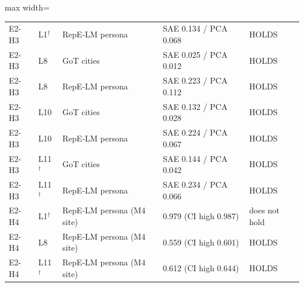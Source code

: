 \begin{table}[t]
\begin{adjustbox}{max width=\linewidth}
\begin{tabular}{lllll}
\midrule
E2-H3 & L1$^\dagger$ & RepE-LM persona & SAE 0.134 / PCA 0.068 & HOLDS \\
E2-H3 & L8 & GoT cities & SAE 0.025 / PCA 0.012 & HOLDS \\
E2-H3 & L8 & RepE-LM persona & SAE 0.223 / PCA 0.112 & HOLDS \\
E2-H3 & L10 & GoT cities & SAE 0.132 / PCA 0.028 & HOLDS \\
E2-H3 & L10 & RepE-LM persona & SAE 0.224 / PCA 0.067 & HOLDS \\
E2-H3 & L11$^\dagger$ & GoT cities & SAE 0.144 / PCA 0.042 & HOLDS \\
E2-H3 & L11$^\dagger$ & RepE-LM persona & SAE 0.234 / PCA 0.066 & HOLDS \\
\midrule
E2-H4 & L1$^\dagger$ & RepE-LM persona (M4 site) & 0.979 (CI high 0.987) & does not hold \\
E2-H4 & L8 & RepE-LM persona (M4 site) & 0.559 (CI high 0.601) & HOLDS \\
E2-H4 & L11$^\dagger$ & RepE-LM persona (M4 site) & 0.612 (CI high 0.644) & HOLDS \\
\bottomrule
\end{tabular}
\end{adjustbox}
\end{table}
